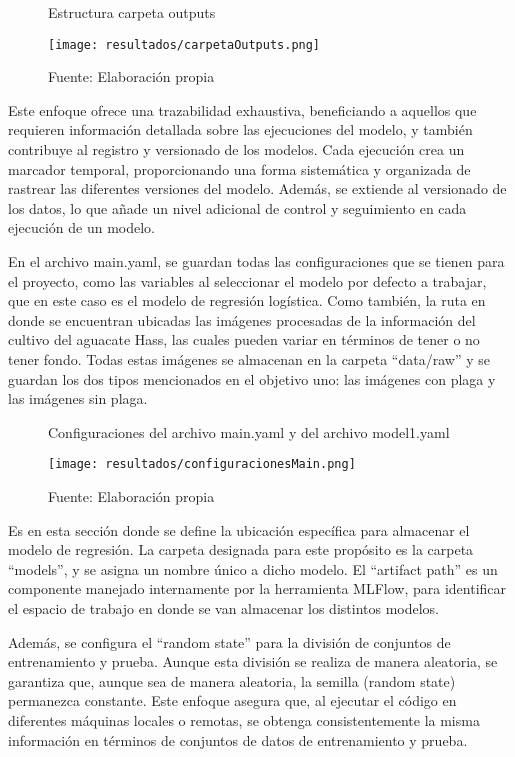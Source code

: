 \begin{figure}[h]
\centering
\caption{Estructura carpeta outputs}
\texttt{[image: resultados/carpetaOutputs.png]}
\caption*{\footnotesize Fuente: Elaboración propia}
\label{fig:figuraEstructuraCarpetaOutputs}
\end{figure}

Este enfoque ofrece una trazabilidad exhaustiva, beneficiando a aquellos que requieren información detallada sobre las ejecuciones del modelo, y también contribuye al registro y versionado de los modelos. Cada ejecución crea un marcador temporal, proporcionando una forma sistemática y organizada de rastrear las diferentes versiones del modelo. Además, se extiende al versionado de los datos, lo que añade un nivel adicional de control y seguimiento en cada ejecución de un modelo. \newline

En el archivo main.yaml, se guardan todas las configuraciones que se tienen para el proyecto, como las variables al seleccionar el modelo por defecto a trabajar, que en este caso es el modelo de regresión logística. Como también, la ruta en donde se encuentran ubicadas las imágenes procesadas de la información del cultivo del aguacate Hass, las cuales pueden variar en términos de tener o no tener fondo. Todas estas imágenes se almacenan en la carpeta “data/raw” y se guardan los dos tipos mencionados en el objetivo uno: las imágenes con plaga y las imágenes sin plaga.

\begin{figure}[h]
\centering
\caption{Configuraciones del archivo main.yaml y del archivo model1.yaml}
\texttt{[image: resultados/configuracionesMain.png]}
\caption*{\footnotesize Fuente: Elaboración propia}
\label{fig:figuraConfiguracionesMain}
\end{figure}

Es en esta sección donde se define la ubicación específica para almacenar el modelo de regresión. La carpeta designada para este propósito es la carpeta ``models'', y se asigna un nombre único a dicho modelo. El ``artifact path'' es un componente manejado internamente por la herramienta MLFlow, para identificar el espacio de trabajo en donde se van almacenar los distintos modelos. \newline

Además, se configura el ``random state'' para la división de conjuntos de entrenamiento y prueba. Aunque esta división se realiza de manera aleatoria, se garantiza que, aunque sea de manera aleatoria, la semilla (random state) permanezca constante. Este enfoque asegura que, al ejecutar el código en diferentes máquinas locales o remotas, se obtenga consistentemente la misma información en términos de conjuntos de datos de entrenamiento y prueba. \newline

